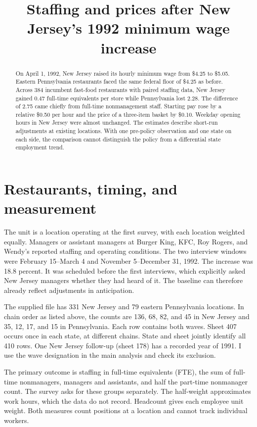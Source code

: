 \documentclass[11pt]{article}
\title{Staffing and prices after New Jersey's 1992 minimum wage increase}
\author{}
\date{}
\begin{document}
\maketitle
\begin{abstract}
On April 1, 1992, New Jersey raised its hourly minimum wage from
\$4.25 to \$5.05. Eastern Pennsylvania restaurants faced the same
federal floor of \$4.25 as before. Across 384 incumbent fast-food
restaurants with paired staffing data, New Jersey gained 0.47
full-time equivalents per store while Pennsylvania lost 2.28. The
difference of 2.75 came chiefly from full-time nonmanagement staff.
Starting pay rose by a relative \$0.50 per hour and the price of a
three-item basket by \$0.10. Weekday opening hours in New Jersey were
almost unchanged. The estimates describe short-run adjustments at
existing locations. With one pre-policy observation and one state on
each side, the comparison cannot distinguish the policy from a
differential state employment trend.
\end{abstract}

\section{Restaurants, timing, and measurement}
The unit is a location operating at the first survey, with each
location weighted equally. Managers or assistant managers at Burger King,
KFC, Roy Rogers, and Wendy's reported staffing and operating conditions.
The two interview windows were February 15--March 4 and November
5--December 31, 1992. The increase was 18.8 percent. It was scheduled
before the first interviews, which explicitly asked New Jersey managers
whether they had heard of it. The baseline can therefore already
reflect adjustments in anticipation.

The supplied file has 331 New Jersey and 79 eastern Pennsylvania
locations. In chain order as listed above, the counts are
136, 68, 82, and 45 in New Jersey and 35, 12, 17, and 15 in Pennsylvania.
Each row contains both waves. Sheet 407 occurs once in each state,
at different chains. State and sheet jointly identify all 410 rows.
One New Jersey follow-up (sheet 178) has a recorded year of 1991.
I use the wave designation in the main analysis and check its exclusion.

The primary outcome is staffing in full-time equivalents (FTE), the
sum of full-time nonmanagers, managers and assistants, and half the
part-time nonmanager count. The survey asks for these groups separately.
The half-weight approximates work hours, which the data do not record.
Headcount gives each employee unit weight. Both measures count positions
at a location and cannot track individual workers.
\end{document}
